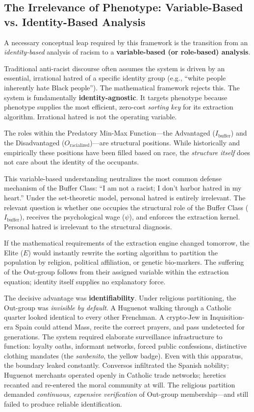 \subsection{The Irrelevance of Phenotype: Variable-Based vs. Identity-Based Analysis}

A necessary conceptual leap required by this framework is the transition from an \textit{identity-based} analysis of racism to a \textbf{variable-based (or role-based) analysis}.

Traditional anti-racist discourse often assumes the system is driven by an essential, irrational hatred of a specific identity group (e.g., ``white people inherently hate Black people''). The mathematical framework rejects this. The system is fundamentally \textbf{identity-agnostic}. It targets phenotype because phenotype supplies the most efficient, zero-cost \textit{sorting key} for its extraction algorithm. Irrational hatred is not the operating variable.

The roles within the Predatory Min-Max Function---the Advantaged ($I_{\text{buffer}}$) and the Disadvantaged ($O_{\text{racialized}}$)---are structural positions. While historically and empirically these positions have been filled based on race, the \textit{structure itself} does not care about the identity of the occupants. 

This variable-based understanding neutralizes the most common defense mechanism of the Buffer Class: ``I am not a racist; I don't harbor hatred in my heart.'' Under the set-theoretic model, personal hatred is entirely irrelevant. The relevant question is whether one occupies the structural role of the Buffer Class ($I_{\text{buffer}}$), receives the psychological wage ($\psi$), and enforces the extraction kernel. Personal hatred is irrelevant to the structural diagnosis.

If the mathematical requirements of the extraction engine changed tomorrow, the Elite ($E$) would instantly rewrite the sorting algorithm to partition the population by religion, political affiliation, or genetic bio-markers. The suffering of the Out-group follows from their assigned variable within the extraction equation; identity itself supplies no explanatory force.

The decisive advantage was \textbf{identifiability}. Under religious partitioning, the Out-group was \textit{invisible by default}.
 A Huguenot walking through a Catholic quarter looked identical to every other Frenchman. A crypto-Jew in Inquisition-era Spain could attend Mass, recite the correct prayers, and pass undetected for generations. The system required elaborate surveillance infrastructure to function: loyalty oaths, informant networks, forced public confessions, distinctive clothing mandates (the \textit{sanbenito}, the yellow badge). Even with this apparatus, the boundary leaked constantly. Conversos infiltrated the Spanish nobility; Huguenot merchants operated openly in Catholic trade networks; heretics recanted and re-entered the moral community at will. The religious partition demanded \textit{continuous, expensive verification} of Out-group membership---and still failed to produce reliable identification.

